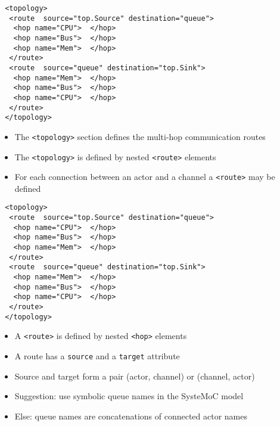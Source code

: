 \begin{frame}[fragile=singleslide]
\begin{lstlisting}
 <topology>
  <route  source="top.Source" destination="queue">
   <hop name="CPU">  </hop>
   <hop name="Bus">  </hop>
   <hop name="Mem">  </hop>
  </route>
  <route  source="queue" destination="top.Sink">
   <hop name="Mem">  </hop>
   <hop name="Bus">  </hop>
   <hop name="CPU">  </hop>
  </route>
 </topology>
\end{lstlisting}
\begin{itemize}
\item The  \lstinline!<topology>! section defines the multi-hop communication routes
\item The \lstinline!<topology>! is defined by nested \lstinline!<route>! elements
\item For each connection between an actor and a channel a  \lstinline!<route>! may be defined
\end{itemize}
\end{frame}


\begin{frame}[fragile=singleslide]
\begin{lstlisting}
 <topology>
  <route  source="top.Source" destination="queue">
   <hop name="CPU">  </hop>
   <hop name="Bus">  </hop>
   <hop name="Mem">  </hop>
  </route>
  <route  source="queue" destination="top.Sink">
   <hop name="Mem">  </hop>
   <hop name="Bus">  </hop>
   <hop name="CPU">  </hop>
  </route>
 </topology>
\end{lstlisting}
\begin{itemize}
\item A \lstinline!<route>! is defined by nested \lstinline!<hop>! elements
\item A route has a \lstinline!source! and a \lstinline!target! attribute
\item Source and target form a pair (actor, channel) or (channel, actor)
\item Suggestion: use symbolic queue names in the SysteMoC model
\item Else: queue names are concatenations of connected actor names
\end{itemize}
\end{frame}

